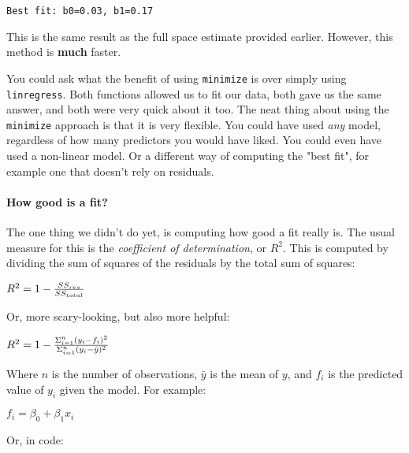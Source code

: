 \documentclass[11pt]{article}
\begin{document}
    \begin{Verbatim}[commandchars=\\\{\}]
Best fit: b0=0.03, b1=0.17

    \end{Verbatim}

    This is the same result as the full space estimate provided earlier.
However, this method is \textbf{much} faster.

You could ask what the benefit of using \texttt{minimize} is over simply
using \texttt{linregress}. Both functions allowed us to fit our data,
both gave us the same answer, and both were very quick about it too. The
neat thing about using the \texttt{minimize} approach is that it is very
flexible. You could have used \emph{any} model, regardless of how many
predictors you would have liked. You could even have used a non-linear
model. Or a different way of computing the "best fit", for example one
that doesn't rely on residuals.

    \paragraph{How good is a fit?}\label{how-good-is-a-fit}

The one thing we didn't do yet, is computing how good a fit really is.
The usual measure for this is the \emph{coefficient of determination},
or \(R^{2}\). This is computed by dividing the sum of squares of the
residuals by the total sum of squares:

\(R^{2} = 1 - {{SS_{res}} \over {SS_{total}}}\)

Or, more scary-looking, but also more helpful:

\(R^{2} = 1 - { { \Sigma^{n}_{i=1} (y_{i} - f_{i})^{2} } \over { \Sigma^{n}_{i=1}(y_{i} - \bar{y})^{2} }}\)

Where \(n\) is the number of observations, \(\bar{y}\) is the mean of
\(y\), and \(f_{i}\) is the predicted value of \(y_{i}\) given the
model. For example:

\(f_{i} = \beta_{0} + \beta_{1} x_{i}\)

Or, in code:
\end{document}
